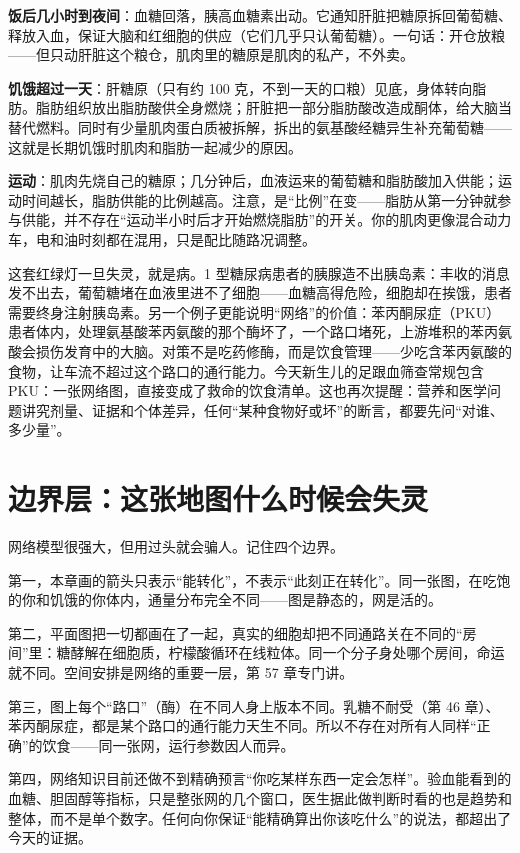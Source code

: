 \textbf{饭后几小时到夜间}：血糖回落，胰高血糖素出动。它通知肝脏把糖原拆回葡萄糖、释放入血，保证大脑和红细胞的供应（它们几乎只认葡萄糖）。一句话：开仓放粮——但只动肝脏这个粮仓，肌肉里的糖原是肌肉的私产，不外卖。

\textbf{饥饿超过一天}：肝糖原（只有约 100 克，不到一天的口粮）见底，身体转向脂肪。脂肪组织放出脂肪酸供全身燃烧；肝脏把一部分脂肪酸改造成酮体，给大脑当替代燃料。同时有少量肌肉蛋白质被拆解，拆出的氨基酸经糖异生补充葡萄糖——这就是长期饥饿时肌肉和脂肪一起减少的原因。

\textbf{运动}：肌肉先烧自己的糖原；几分钟后，血液运来的葡萄糖和脂肪酸加入供能；运动时间越长，脂肪供能的比例越高。注意，是“比例”在变——脂肪从第一分钟就参与供能，并不存在“运动半小时后才开始燃烧脂肪”的开关。你的肌肉更像混合动力车，电和油时刻都在混用，只是配比随路况调整。

这套红绿灯一旦失灵，就是病。1 型糖尿病患者的胰腺造不出胰岛素：丰收的消息发不出去，葡萄糖堵在血液里进不了细胞——血糖高得危险，细胞却在挨饿，患者需要终身注射胰岛素。另一个例子更能说明“网络”的价值：苯丙酮尿症（PKU）患者体内，处理氨基酸苯丙氨酸的那个酶坏了，一个路口堵死，上游堆积的苯丙氨酸会损伤发育中的大脑。对策不是吃药修酶，而是饮食管理——少吃含苯丙氨酸的食物，让车流不超过这个路口的通行能力。今天新生儿的足跟血筛查常规包含 PKU：一张网络图，直接变成了救命的饮食清单。这也再次提醒：营养和医学问题讲究剂量、证据和个体差异，任何“某种食物好或坏”的断言，都要先问“对谁、多少量”。

\section{边界层：这张地图什么时候会失灵}

网络模型很强大，但用过头就会骗人。记住四个边界。

第一，本章画的箭头只表示“能转化”，不表示“此刻正在转化”。同一张图，在吃饱的你和饥饿的你体内，通量分布完全不同——图是静态的，网是活的。

第二，平面图把一切都画在了一起，真实的细胞却把不同通路关在不同的“房间”里：糖酵解在细胞质，柠檬酸循环在线粒体。同一个分子身处哪个房间，命运就不同。空间安排是网络的重要一层，第 57 章专门讲。

第三，图上每个“路口”（酶）在不同人身上版本不同。乳糖不耐受（第 46 章）、苯丙酮尿症，都是某个路口的通行能力天生不同。所以不存在对所有人同样“正确”的饮食——同一张网，运行参数因人而异。

第四，网络知识目前还做不到精确预言“你吃某样东西一定会怎样”。验血能看到的血糖、胆固醇等指标，只是整张网的几个窗口，医生据此做判断时看的也是趋势和整体，而不是单个数字。任何向你保证“能精确算出你该吃什么”的说法，都超出了今天的证据。

